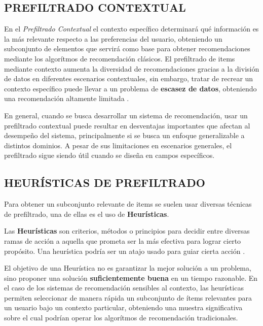 \newpage

\subsection{PREFILTRADO CONTEXTUAL}

En el \textit{Prefiltrado Contextual} el contexto específico determinará qué información es la más relevante respecto a las preferencias del usuario, obteniendo un subconjunto de elementos que servirá como base para obtener recomendaciones mediante los algorítmos de recomendación clásicos.
El prefiltrado de items mediante contexto aumenta la diversidad de recomendaciones gracias a la división de datos en diferentes escenarios contextuales, sin embargo, tratar de recrear un contexto específico puede llevar a un problema de \textbf{escasez de datos}, obteniendo una recomendación altamente limitada \parencite{mateos2024systematic}.

En general, cuando se busca desarrollar un sistema de recomendación, usar un prefiltrado contextual puede resultar en desventajas importantes que afectan al desempeño del sistema, principalmente si se busca un enfoque generalizable a distintos dominios. A pesar de sus limitaciones en escenarios generales, el prefiltrado sigue siendo útil cuando se diseña en campos específicos.

\subsection{HEURÍSTICAS DE PREFILTRADO}

Para obtener un subconjunto relevante de items se suelen usar diversas técnicas de prefiltrado, una de ellas es el uso de \textbf{Heurísticas}.

\begin{definition}
    Las \textbf{Heurísticas} son criterios, métodos o principios para decidir entre diversas ramas de acción a aquella que prometa ser la más efectiva para lograr cierto propósito. Una heurística podría ser un atajo usado para guiar cierta acción \parencite{Pearl1984}.
\end{definition}

El objetivo de una Heurística no es garantizar la mejor solución a un problema, sino proponer una solución \textbf{suficientemente buena} en un tiempo razonable. En el caso de los sistemas de recomendación sensibles al contexto, las heurísticas permiten seleccionar de manera rápida un subconjunto de ítems relevantes para un usuario bajo un contexto particular, obteniendo una muestra significativa sobre el cual podrían operar los algorítmos de recomendación tradicionales.

